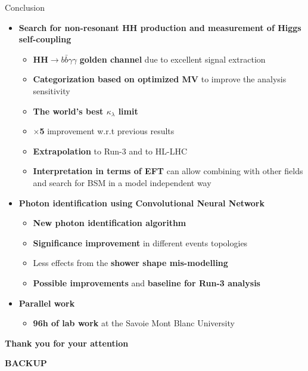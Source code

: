 \begin{frame}{Conclusion}
    \begin{itemize}
        \item \textcolor{HHturquoise_d}{\textbf{Search for non-resonant HH production and measurement of Higgs self-coupling}}
        \begin{itemize}
            \item \textbf{HH$\to b\bar{b}\gamma\gamma$} \textcolor{HHred}{\textbf{golden channel}} due to excellent signal extraction
            \item \textbf{Categorization based on optimized MV} to improve the analysis sensitivity 
            \item \textcolor{HHred}{\textbf{The world's best $\kappa_{\lambda}$ limit}}
            \item \textbf{$\times$5} improvement w.r.t previous results
            \item \textbf{Extrapolation} to Run-3 and to HL-LHC 
            \item \textbf{Interpretation in terms of EFT} can allow combining with other fields and search for BSM in a model independent way
        \end{itemize}
        \item \textcolor{HHturquoise_d}{\textbf{Photon identification using Convolutional Neural Network}}
        \begin{itemize}
            \item \textbf{New photon identification algorithm}
            \item \textcolor{HHred}{\textbf{Significance improvement}} in different events topologies
            \item Less effects from the \textbf{shower shape mis-modelling}
            \item \textbf{Possible improvements} and \textbf{baseline for Run-3 analysis}
        \end{itemize}
        \item \textcolor{HHturquoise_d}{\textbf{Parallel work}}
        \begin{itemize}
            \item \textbf{96h of lab work} at the Savoie Mont Blanc University
        \end{itemize}
    \end{itemize}
\end{frame}

{
\begin{frame}
\begin{center}
       \Huge\textbf{Thank you for your attention}
    \end{center}
\end{frame}
}

\begin{frame}
\begin{center}
       \Huge\textbf{BACKUP}
    \end{center}
\end{frame}

